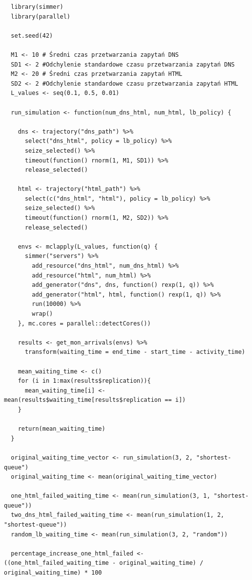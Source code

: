 \documentclass[12pt,oneside,a4paper]{book} %
\theoremstyle{break}
\begin{document}
\begin{small}
\begin{verbatim}
  library(simmer)
  library(parallel)
  
  set.seed(42)
  
  M1 <- 10 # Średni czas przetwarzania zapytań DNS
  SD1 <- 2 #Odchylenie standardowe czasu przetwarzania zapytań DNS
  M2 <- 20 # Średni czas przetwarzania zapytań HTML
  SD2 <- 2 #Odchylenie standardowe czasu przetwarzania zapytań HTML
  L_values <- seq(0.1, 0.5, 0.01)
  
  run_simulation <- function(num_dns_html, num_html, lb_policy) {
  
    dns <- trajectory("dns_path") %>%
      select("dns_html", policy = lb_policy) %>% 
      seize_selected() %>%
      timeout(function() rnorm(1, M1, SD1)) %>%
      release_selected()
  
    html <- trajectory("html_path") %>%
      select(c("dns_html", "html"), policy = lb_policy) %>%
      seize_selected() %>%
      timeout(function() rnorm(1, M2, SD2)) %>%
      release_selected()
  
    envs <- mclapply(L_values, function(q) {
      simmer("servers") %>%
        add_resource("dns_html", num_dns_html) %>%
        add_resource("html", num_html) %>%
        add_generator("dns", dns, function() rexp(1, q)) %>%
        add_generator("html", html, function() rexp(1, q)) %>%
        run(10000) %>%
        wrap()
    }, mc.cores = parallel::detectCores())
  
    results <- get_mon_arrivals(envs) %>% 
      transform(waiting_time = end_time - start_time - activity_time)
  
    mean_waiting_time <- c()
    for (i in 1:max(results$replication)){
      mean_waiting_time[i] <- mean(results$waiting_time[results$replication == i])
    }
  
    return(mean_waiting_time)
  }
  
  original_waiting_time_vector <- run_simulation(3, 2, "shortest-queue")
  original_waiting_time <- mean(original_waiting_time_vector)
  
  one_html_failed_waiting_time <- mean(run_simulation(3, 1, "shortest-queue"))
  two_dns_html_failed_waiting_time <- mean(run_simulation(1, 2, "shortest-queue"))
  random_lb_waiting_time <- mean(run_simulation(3, 2, "random"))
  
  percentage_increase_one_html_failed <- ((one_html_failed_waiting_time - original_waiting_time) / original_waiting_time) * 100
  

\end{verbatim}
\end{small}
\end{document}
